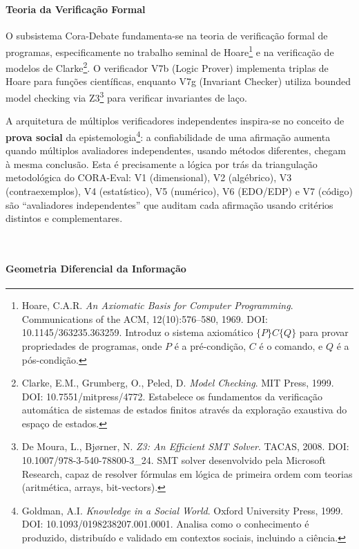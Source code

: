 \\\paragraph{Teoria da Verificação Formal}

O subsistema Cora-Debate fundamenta-se na teoria de verificação formal de
programas, especificamente no trabalho seminal de Hoare\footnote{Hoare,
C.A.R. \textit{An Axiomatic Basis for Computer Programming}. Communications
of the ACM, 12(10):576--580, 1969. DOI: 10.1145/363235.363259. Introduz o
sistema axiomático $\{P\}C\{Q\}$ para provar propriedades de programas,
onde $P$ é a pré-condição, $C$ é o comando, e $Q$ é a pós-condição.} e na
verificação de modelos de Clarke\footnote{Clarke, E.M., Grumberg, O., Peled,
D. \textit{Model Checking}. MIT Press, 1999. DOI: 10.7551/mitpress/4772.
Estabelece os fundamentos da verificação automática de sistemas de estados
finitos através da exploração exaustiva do espaço de estados.}. O verificador
V7b (Logic Prover) implementa triplas de Hoare para funções científicas,
enquanto V7g (Invariant Checker) utiliza bounded model checking via Z3\footnote{De Moura, L., Bjørner, N. \textit{Z3: An Efficient SMT Solver}. TACAS,
2008. DOI: 10.1007/978-3-540-78800-3\_24. SMT solver desenvolvido pela
Microsoft Research, capaz de resolver fórmulas em lógica de primeira ordem
com teorias (aritmética, arrays, bit-vectors).} para verificar invariantes
de laço.

A arquitetura de múltiplos verificadores independentes inspira-se no conceito
de \textbf{prova social} da epistemologia\footnote{Goldman, A.I.
\textit{Knowledge in a Social World}. Oxford University Press, 1999. DOI:
10.1093/0198238207.001.0001. Analisa como o conhecimento é produzido,
distribuído e validado em contextos sociais, incluindo a ciência.}: a
confiabilidade de uma afirmação aumenta quando múltiplos avaliadores
independentes, usando métodos diferentes, chegam à mesma conclusão. Esta
é precisamente a lógica por trás da triangulação metodológica do CORA-Eval:
V1 (dimensional), V2 (algébrico), V3 (contraexemplos), V4 (estatístico),
V5 (numérico), V6 (EDO/EDP) e V7 (código) são ``avaliadores independentes''
que auditam cada afirmação usando critérios distintos e complementares.

\\\paragraph{Geometria Diferencial da Informação}

